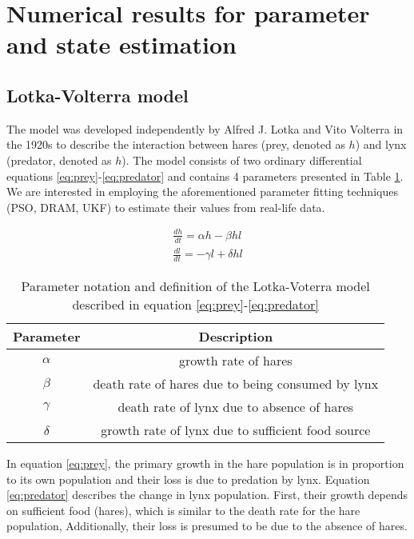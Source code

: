 \documentclass[review]{elsarticle}
\begin{document}
\section{Numerical results for parameter and state estimation}\label{RESULT}

\subsection{Lotka-Volterra model} \label{MODEL}

The model was developed independently by Alfred J. Lotka and Vito Volterra in the 1920s to describe the interaction between hares (prey, denoted as $h$) and lynx (predator, denoted as $h$). The model consists of two ordinary differential equations \ref{eq:prey}-\ref{eq:predator} and contains 4 parameters presented in Table \ref{tab:parameters}. We are interested in employing the aforementioned parameter fitting techniques (PSO, DRAM, UKF) to estimate their values from real-life data. 

\begin{align} 
\frac{dh}{dt} = \alpha h - \beta hl  \label{eq:prey} \\
\frac{dl}{dt} = -\gamma l + \delta hl \label{eq:predator}
\end{align}

\begin{table}[ht!]
\centering
\begin{tabular}{c | c }
\hline 
Parameter & Description \\
\hline 
$\alpha$ & growth rate of hares\\
$\beta$ & death rate of hares due to being consumed by lynx\\
$\gamma$ & death rate of lynx due to absence of hares\\
$\delta$ & growth rate of lynx due to sufficient food source\\
\hline
\end{tabular}
\caption{\scriptsize{Parameter notation and definition of the Lotka-Voterra model described in equation \eqref{eq:prey}-\eqref{eq:predator}}}
\label{tab:parameters}
\end{table}

In equation \eqref{eq:prey}, the primary growth in the hare population is in proportion to its own population and their loss is due to predation by lynx. Equation \eqref{eq:predator} describes the change in lynx population. First, their growth depends on sufficient food (hares), which is similar to the death rate for the hare population, Additionally, their loss is presumed to be due to the absence of hares. 
\end{document}
